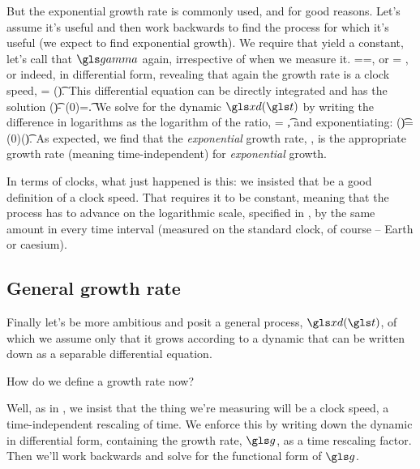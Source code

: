 But the exponential growth rate is commonly used, and for good reasons. Let's assume it's useful and then work backwards to find the process for which it's useful (we expect to find exponential growth). We require that  yield a constant, let's call that $\ggamma$ again, irrespective of when we measure it.
\be
 \gexp=\frac{\D \ln \xd}{\Dt}=\ggamma,
\ee
or
\be
\D \ln \xd = \ggamma\Dt,
\ee
or indeed, in differential form, revealing that again the growth rate is a clock speed,
\be
\gd\ln \xd = \gd(\ggamma \t).
\ee
This differential equation can be directly integrated and has the solution
\be
\ln \xd(\t)- \ln \xd(0)=\ggamma \t.
\ee
We solve for the dynamic $\xd(\t)$ by writing the difference in logarithms as the logarithm of the ratio,
\be
\ln {} = \ggamma \t ,
\ee
and exponentiating:
\be
\xd(\t)=\xd(0)\exp(\ggamma \t).
\ee
As expected, we find that the {\it exponential} growth rate, , is the appropriate 
growth rate (meaning time-independent) for {\it exponential} growth.

In terms of clocks, what just happened is this: we insisted that  be a good 
definition of a clock speed. That requires it to be constant, meaning that the process has 
to advance on the logarithmic scale, specified in , by the same amount in 
every time interval (measured on the standard clock, of course -- Earth or caesium).

\subsection{General growth rate}

Finally let's be more ambitious and posit a general process, $\xd(\t)$, of which we assume only that it grows according to a dynamic that can be written down as a separable differential equation. 

How do we define a growth rate now?

Well, as in , we insist that the thing we're measuring will be a clock speed, \ie a 
time-independent rescaling of time. We enforce this by writing down the dynamic in differential 
form, containing the growth rate, $\g$, as a time rescaling factor. Then we'll work backwards and solve 
for the functional form of $\g$.

